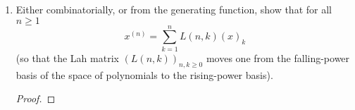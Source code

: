 \documentclass{article}
\begin{document}
\begin{enumerate}[label={(\alph*)}]
    \item Either combinatorially, or from the generating function, show
      that for all $n\geq1$
      \[x^{(n)} =\sum_{k=1}^n L(n,k)(x)_k\]
      (so that the Lah matrix $(L(n,k))_{n,k\geq0}$ moves one from the
      falling-power basis of the space of polynomials to the rising-power
      basis).

      \begin{proof}
      \end{proof}
  \end{enumerate}
\end{document}
